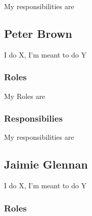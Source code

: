 	My responsibilities are


\subsection{Peter Brown}

I do X, I'm meant to do Y



\subsubsection{Roles}

	My Roles are


\subsubsection{Responsibilies}

	My responsibilities are


\subsection{Jaimie Glennan}

I do X, I'm meant to do Y



\subsubsection{Roles}

